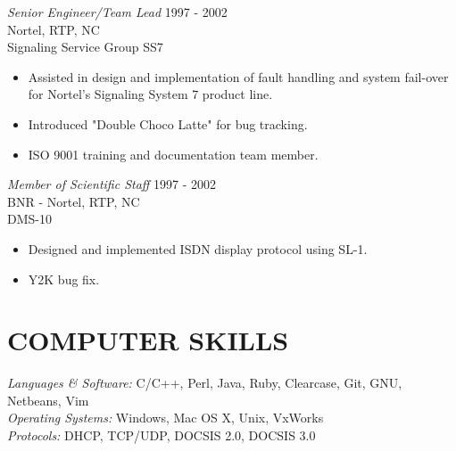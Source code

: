 \documentclass[line,margin]{res}
\begin{document}
\begin{resume}
                {\sl Senior Engineer/Team Lead} \hfill 1997 - 2002 \\
                Nortel, RTP, NC \\
                Signaling Service Group SS7
                 \begin{itemize}  \itemsep -2pt %
                 \item Assisted in design and implementation of fault handling and system fail-over for Nortel's Signaling System 7 product line.
                 \item Introduced "Double Choco Latte" for bug tracking. 
                 \item ISO 9001 training and documentation team member.
                 \end{itemize}
                
                {\sl Member of Scientific Staff} \hfill 1997 - 2002 \\
                BNR - Nortel, RTP, NC \\
                DMS-10
                 \begin{itemize}  \itemsep -2pt %
                 \item Designed and implemented ISDN display protocol using SL-1.
                 \item Y2K bug fix.
                 \end{itemize}


\section{COMPUTER SKILLS} {\sl Languages \& Software:} C/C++, Perl, Java,
                Ruby, Clearcase, Git, GNU, Netbeans, Vim \\
                {\sl Operating Systems:} Windows, Mac OS X, Unix, VxWorks \\ 
                {\sl Protocols:} DHCP, TCP/UDP, DOCSIS 2.0, DOCSIS 3.0


\end{resume}
\end{document}

